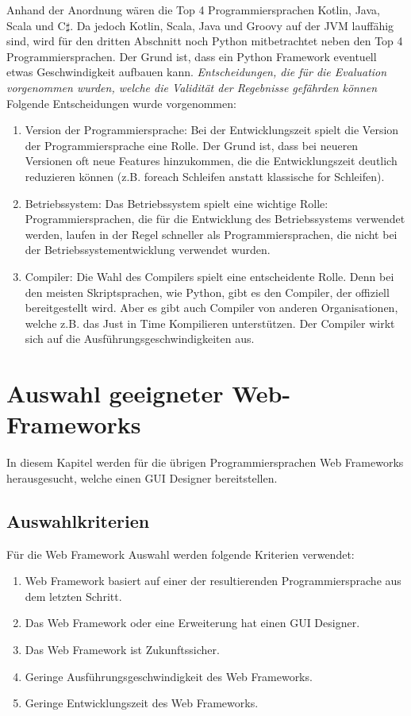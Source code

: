 \documentclass[ngerman]{article}
\begin{document}
    Anhand der Anordnung wären die Top 4 Programmiersprachen Kotlin, Java, Scala und C$\sharp$. Da jedoch Kotlin, Scala, Java und Groovy auf der JVM lauffähig sind, wird für den dritten Abschnitt noch Python mitbetrachtet neben den Top 4 Programmiersprachen. Der Grund ist, dass ein Python Framework eventuell etwas Geschwindigkeit aufbauen kann.
    \textit{Entscheidungen, die für die Evaluation vorgenommen wurden, welche die Validität der Regebnisse gefährden können}\\
    Folgende Entscheidungen wurde vorgenommen:
    \begin{enumerate}
        \item Version der Programmiersprache: Bei der Entwicklungszeit spielt die Version der Programmiersprache eine Rolle. Der Grund ist, dass bei neueren Versionen oft neue Features hinzukommen, die die Entwicklungszeit deutlich reduzieren können (z.B. foreach Schleifen anstatt klassische for Schleifen).
        \item Betriebssystem: Das Betriebssystem spielt eine wichtige Rolle: Programmiersprachen, die für die Entwicklung des Betriebssystems verwendet werden, laufen in der Regel schneller als Programmiersprachen, die nicht bei der Betriebssystementwicklung verwendet wurden.
        \item Compiler: Die Wahl des Compilers spielt eine entscheidente Rolle. Denn bei den meisten Skriptsprachen, wie Python, gibt es den Compiler, der offiziell bereitgestellt wird. Aber es gibt auch Compiler von anderen Organisationen, welche z.B. das Just in Time Kompilieren unterstützen. Der Compiler wirkt sich auf die Ausführungsgeschwindigkeiten aus.
    \end{enumerate}
    \newpage\noindent
    \section{Auswahl geeigneter Web-Frameworks}
    \label{AuswahlFrameworks}
    In diesem Kapitel werden für die übrigen Programmiersprachen Web Frameworks herausgesucht, welche einen GUI Designer bereitstellen.
    \subsection{Auswahlkriterien}
    Für die Web Framework Auswahl werden folgende Kriterien verwendet:
    \begin{enumerate}
        \item Web Framework basiert auf einer der resultierenden Programmiersprache aus dem letzten Schritt.
        \item Das Web Framework oder eine Erweiterung hat einen GUI Designer.
        \item Das Web Framework ist Zukunftssicher.
        \item Geringe Ausführungsgeschwindigkeit des Web Frameworks.
        \item Geringe Entwicklungszeit des Web Frameworks.
    \end{enumerate}
\end{document}
